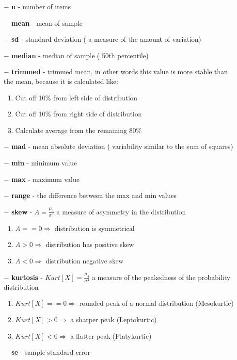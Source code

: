 \documentclass{article}
\begin{document}
\begin{itemize}
  \item[$-$] \textbf{n} - number of items
  \item[$-$] \textbf{mean} - mean of sample
  \item[$-$] \textbf{sd} - standard deviation ( a measure of the amount of variation)
  \item[$-$] \textbf{median} -  median of sample ( 50th percentile)
  \item[$-$] \textbf{trimmed} - trimmed mean, in other words this value is more stable than the mean, because it is calculated like:
    \begin{enumerate}
      \item Cut off 10\% from left side of distribution
      \item Cut off 10\% from right side of distribution
      \item Calculate average from the remaining 80\% 
    \end{enumerate}
  \item[$-$] \textbf{mad} - mean absolute deviation ( variability similar to the sum of squares)
  \item[$-$] \textbf{min} - minimum value
  \item[$-$] \textbf{max} - maximum value
  \item[$-$] \textbf{range} -  the difference between the max and min values
  \item[$-$] \textbf{skew} - \(A =\frac{\mu_3}{\sigma^3} \) a measure of asymmetry in the distribution
  \begin{enumerate}
    \item \( A==0 \Rightarrow\) distribution is symmetrical 
    \item \( A>0 \Rightarrow\) distribution has positive skew 
    \item \( A<0 \Rightarrow\) distribution negative skew 
    \end{enumerate}  
  \item[$-$] \textbf{kurtosis} - \(Kurt[X] = \frac{\mu_4}{\sigma^4}\) a measure of the peakedness of the probability distribution
    \begin{enumerate}
    \item \(Kurt[X]==0 \Rightarrow\) rounded peak of a normal distribution (Mesokurtic)
    \item \(Kurt[X]>0 \Rightarrow\) a sharper peak (Leptokurtic)
    \item \(Kurt[X]<0 \Rightarrow \) a flatter peak (Platykurtic)
    \end{enumerate}  
  \item[$-$] \textbf{se} - sample standard error
\end{itemize}
\end{document}
